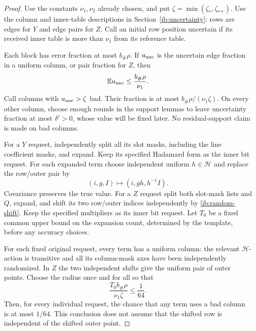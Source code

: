 \begin{proof}
Use the constants \(\nu_1,\nu_2\) already chosen, and put
\(\zeta=\min(\zeta_*,\zeta_{**})\). Use the column and inner-table
descriptions in Section~\ref{ib:uncertainty}: rows are edges for \(Y\) and edge pairs
for \(Z\). Call an initial row position uncertain if its received inner
table is more than \(\nu_1\) from its reference table.

Each block has error fraction at most \(b_\#\rho\).  If
\(u_{\rm unc}\) is the uncertain edge fraction in a uniform
column, or pair fraction for \(Z\), then
\begin{equation}
 \mathbb{E} u_{\rm unc}\le\frac{b_\#\rho}{\nu_1}.
 \label{ib:uncertain-average}
\end{equation}
Call columns with \(u_{\rm unc}>\zeta\) bad.  Their fraction is
at most \(b_\#\rho/(\nu_1\zeta)\).  On every other column,
choose enough rounds in the support lemmas to leave uncertainty
fraction at most \(\delta'>0\), whose value will be fixed later.
No residual-support claim is made on bad columns.

For a \(Y\) request, independently split all its slot masks,
including the line coefficient masks, and expand.  Keep its
specified Hadamard form as the inner bit request.  For each expanded
term choose independent uniform \(h\in\mathcal H\) and replace
the row/outer pair by
\begin{equation}
 (i,g,I)\longmapsto(i,gh,h^{-1}I).
 \label{ib:random-shift}
\end{equation}
Covariance preserves the true value.  For a \(Z\) request split
both slot-mask lists and \(Q\), expand, and shift its two row/outer
indices independently by \eqref{ib:random-shift}.  Keep the
specified multipliers as its inner bit request.  Let \(T_0\) be
a fixed common upper bound on the expansion count, determined by
the template, before any accuracy choices.

For each fixed original request, every term has a uniform column:
the relevant \(\mathcal H\)-action is transitive and all its
column-mask axes have been independently randomized.  In \(Z\)
the two independent shifts give the uniform pair of outer points.
Choose the radius once and for all so that
\begin{equation}
 \frac{T_0b_\#\rho}{\nu_1\zeta}\le\frac1{64}.
 \label{ib:fixed-radius}
\end{equation}
Then, for every individual request, the chance that any term uses
a bad column is at most \(1/64\).  This conclusion does not assume
that the shifted row is independent of the shifted outer point.


\end{proof}
